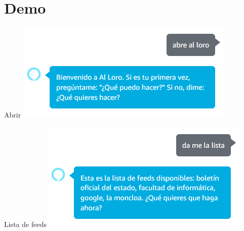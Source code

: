 \documentclass{beamer}
\begin{document}
  \section[Demo - Skill]{Demo}

  \begin{frame}{Abrir}
    \includegraphics[width=\textwidth]{abrir.png}
  \end{frame}

  \begin{frame}{Lista de feeds}
    \includegraphics[width=\textwidth]{lista-feeds.png}
  \end{frame}
 
\end{document}
